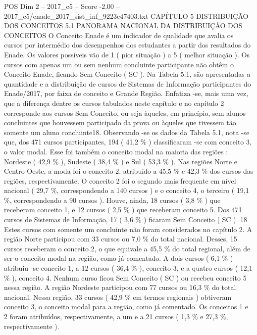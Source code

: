 \begin{textsample}{POS Dim 2 – 2017\_c5 – Score -2.00 – 2017\_c5/enade\_2017\_sist\_inf\_9223c47403.txt}  \label{ex:f2_pos_393}
CAPÍTULO 5 DISTRIBUIÇÃO DOS CONCEITOS 5.1 PANORAMA NACIONAL DA DISTRIBUIÇÃO DOS CONCEITOS O Conceito Enade é um indicador de qualidade que avalia os cursos por intermédio dos desempenhos dos estudantes a partir dos resultados do Enade.
Os valores possíveis vão de 1 ( pior situação ) a 5 ( melhor situação ).
Os cursos com apenas um ou sem nenhum concluinte participante não obtêm o Conceito Enade, ficando Sem Conceito ( SC ).
Na Tabela 5.1, são apresentadas a quantidade e a distribuição de cursos de Sistemas de Informação participantes do Enade/2017, por faixa de conceito e Grande Região.
Enfatiza -se, mais uma vez, que a diferença dentre os cursos tabulados neste capítulo e no capítulo 2 corresponde aos cursos Sem Conceito, ou seja àqueles, em princípio, sem alunos concluintes que houvessem participado da prova ou àqueles que tivessem tão somente um aluno concluinte18.
Observando -se os dados da Tabela 5.1, nota -se que, dos 471 cursos participantes, 194 ( 41,2 \% ) classificaram -se com conceito 3, o valor modal.
Esse foi também o conceito modal na maioria das regiões : Nordeste ( 42,9 \% ), Sudeste ( 38,4 \% ) e Sul ( 53,3 \% ).
Nas regiões Norte e Centro-Oeste, a moda foi o conceito 2, atribuído a 45,5 \% e 42,3 \% dos cursos das regiões, respectivamente.
O conceito 2 foi o segundo mais frequente em nível nacional ( 29,7 \%, correspondendo a 140 cursos ) e o conceito 4, o terceiro ( 19,1 \%, correspondendo a 90 cursos ).
Houve, ainda, 18 cursos ( 3,8 \% ) que receberam conceito 1, e 12 cursos ( 2,5 \% ) que receberam conceito 5.
Dos 471 cursos de Sistemas de Informação, 17 ( 3,6 \% ) ficaram Sem Conceito ( SC ). 18 Estes cursos com somente um concluinte não foram considerados no capítulo 2.
A região Norte participou com 33 cursos ou 7,0 \% do total nacional.
Desses, 15 cursos receberam o conceito 2, o que equivale a 45,5 \% do total regional, além de ser o conceito modal na região, como já comentado.
A dois cursos ( 6,1 \% ) atribuiu -se conceito 1, a 12 cursos ( 36,4 \% ), conceito 3, e a quatro cursos ( 12,1 \% ), conceito 4.
Nenhum curso ficou Sem Conceito ( SC ) ou recebeu conceito 5 nessa região.
A região Nordeste participou com 77 cursos ou 16,3 \% do total nacional.
Nessa região, 33 cursos ( 42,9 \% em termos regionais ) obtiveram conceito 3, o conceito modal para a região, como já comentado.
Os conceitos 1 e 2 foram atribuídos, respectivamente, a um e a 21 cursos ( 1,3 \% e 27,3 \%, respectivamente ).

\end{textsample}
